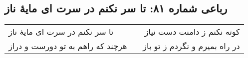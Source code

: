 \begin{center}
\section*{رباعی شماره ۸۱: تا سر نکنم در سرت ای مایهٔ ناز}
\label{sec:081}
\begin{longtable}{l p{0.5cm} r}
تا سر نکنم در سرت ای مایهٔ ناز
&&
کوته نکنم ز دامنت دست نیاز
\\
هرچند که راهم به تو دورست و دراز
&&
در راه بمیرم و نگردم ز تو باز
\\
\end{longtable}
\end{center}
